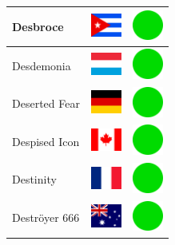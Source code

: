 \documentclass[12pt, a4paper, twoside]{report}
\begin{document}
\begin{center}
\begin{longtable}{|p{5cm}|p{2cm}|p{2cm}|}
 Desbroce                                                   & \includegraphics[width=1cm]{../4x3/cu} &   \includegraphics[width=1cm]{../likes/y} \\ \hline
 Desdemonia                                                 & \includegraphics[width=1cm]{../4x3/lu} &   \includegraphics[width=1cm]{../likes/y} \\ \hline
 Deserted Fear                                              & \includegraphics[width=1cm]{../4x3/de} &   \includegraphics[width=1cm]{../likes/y} \\ \hline
 Despised Icon                                              & \includegraphics[width=1cm]{../4x3/ca} &   \includegraphics[width=1cm]{../likes/y} \\ \hline
 Destinity                                                  & \includegraphics[width=1cm]{../4x3/fr} &   \includegraphics[width=1cm]{../likes/y} \\ \hline
 Deströyer 666                                              & \includegraphics[width=1cm]{../4x3/au} &   \includegraphics[width=1cm]{../likes/y} \\ \hline

\end{longtable}
\end{center}
\end{document}
